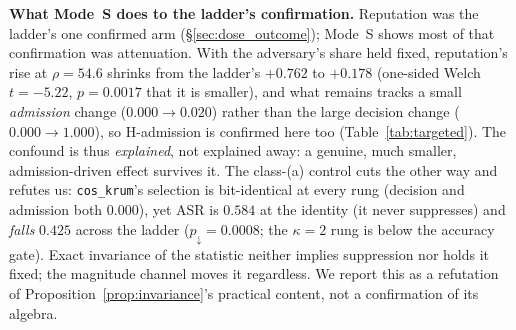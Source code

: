 \documentclass{article}
\begin{document}
\label{app:score_only}

\textbf{What Mode~S does to the ladder's confirmation.} Reputation was the ladder's one confirmed arm (§\ref{sec:dose_outcome}); Mode~S shows most of that confirmation was attenuation. With the adversary's share held fixed, reputation's rise at $\rho{=}54.6$ shrinks from the ladder's $+0.762$ to $+0.178$ (one-sided Welch $t{=}{-}5.22$, $p{=}0.0017$ that it is smaller), and what remains tracks a small \emph{admission} change ($0.000 \to 0.020$) rather than the large decision change ($0.000 \to 1.000$), so H-admission is confirmed here too (Table~\ref{tab:targeted}). The confound is thus \emph{explained}, not explained away: a genuine, much smaller, admission-driven effect survives it. The class-(a) control cuts the other way and refutes us: \texttt{cos\_krum}'s selection is bit-identical at every rung (decision and admission both $0.000$), yet ASR is $0.584$ at the identity (it never suppresses) and \emph{falls} $0.425$ across the ladder ($p_{\downarrow}{=}0.0008$; the $\kappa{=}2$ rung is below the accuracy gate). Exact invariance of the statistic neither implies suppression nor holds it fixed; the magnitude channel moves it regardless. We report this as a refutation of Proposition~\ref{prop:invariance}'s practical content, not a confirmation of its algebra.
\end{document}
